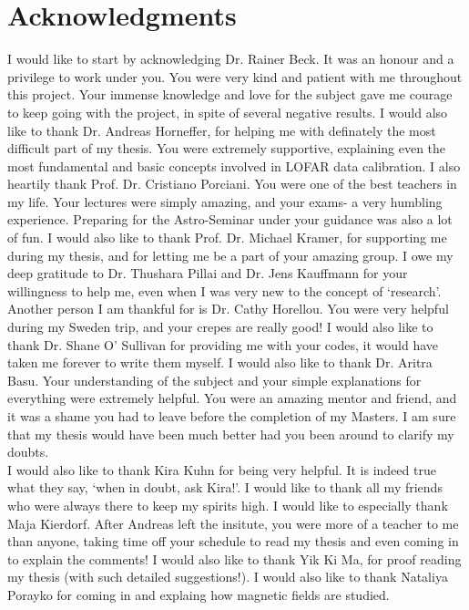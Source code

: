 \documentclass[../main/thesis_msc.tex]{subfiles}
\begin{document}
    \chapter*{Acknowledgments}
    \thispagestyle{plain}

I would like to start by acknowledging Dr. Rainer Beck. It was an honour and a privilege to work under you. You were very kind and patient with me throughout this project. Your immense knowledge and love for the subject gave me courage to keep going with the project, in spite of several negative results. I would also like to thank Dr. Andreas Horneffer, for helping me with definately the most difficult part of my thesis. You were extremely supportive, explaining even the most fundamental and basic concepts involved in LOFAR data calibration. I also heartily thank Prof. Dr. Cristiano Porciani. You were one of the best teachers in my life. Your lectures were simply amazing, and your exams- a very humbling experience. Preparing for the Astro-Seminar under your guidance was also a lot of fun. I would also like to thank Prof. Dr. Michael Kramer, for supporting me during my thesis, and for letting me be a part of your amazing group. I owe my deep gratitude to Dr. Thushara Pillai and Dr. Jens Kauffmann for your willingness to help me, even when I was very new to the concept of `research'. Another person I am thankful for is Dr. Cathy Horellou. You were very helpful during my Sweden trip, and your crepes are really good! I would also like to thank Dr. Shane O' Sullivan for providing me with your codes, it would have taken me forever to write them myself. I would also like to thank Dr. Aritra Basu. Your understanding of the subject and your simple explanations for everything were extremely helpful. You were an amazing mentor and friend, and it was a shame you had to leave before the completion of my Masters. I am sure that my thesis would have been much better had you been around to clarify my doubts.\\
 \indent     I would also like to thank Kira Kuhn for being very helpful. It is indeed true what they say, `when in doubt, ask Kira!'. I would like to thank all my friends who were always there to keep my spirits high. I would like to especially thank Maja Kierdorf. After Andreas left the insitute, you were more of a teacher to me than anyone, taking time off your schedule to read my thesis and even coming in to explain the comments! I would also like to thank Yik Ki Ma, for proof reading my thesis (with such detailed suggestions!). I would also like to thank Nataliya Porayko for coming in and explaing how magnetic fields are studied.  \\
\end{document}
